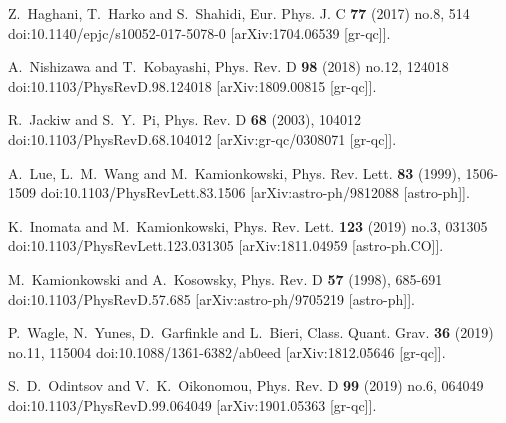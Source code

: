 \documentclass{article}
\begin{document}
\begin{thebibliography}{99}
Z.~Haghani, T.~Harko and S.~Shahidi,
Eur. Phys. J. C \textbf{77} (2017) no.8, 514
doi:10.1140/epjc/s10052-017-5078-0
[arXiv:1704.06539 [gr-qc]].


A.~Nishizawa and T.~Kobayashi,
Phys. Rev. D \textbf{98} (2018) no.12, 124018
doi:10.1103/PhysRevD.98.124018
[arXiv:1809.00815 [gr-qc]].


R.~Jackiw and S.~Y.~Pi,
Phys. Rev. D \textbf{68} (2003), 104012
doi:10.1103/PhysRevD.68.104012
[arXiv:gr-qc/0308071 [gr-qc]].


A.~Lue, L.~M.~Wang and M.~Kamionkowski,
Phys. Rev. Lett. \textbf{83} (1999), 1506-1509
doi:10.1103/PhysRevLett.83.1506
[arXiv:astro-ph/9812088 [astro-ph]].

K.~Inomata and M.~Kamionkowski,
Phys. Rev. Lett. \textbf{123} (2019) no.3, 031305
doi:10.1103/PhysRevLett.123.031305
[arXiv:1811.04959 [astro-ph.CO]].


M.~Kamionkowski and A.~Kosowsky,
Phys. Rev. D \textbf{57} (1998), 685-691
doi:10.1103/PhysRevD.57.685
[arXiv:astro-ph/9705219 [astro-ph]].


P.~Wagle, N.~Yunes, D.~Garfinkle and L.~Bieri,
Class. Quant. Grav. \textbf{36} (2019) no.11, 115004
doi:10.1088/1361-6382/ab0eed
[arXiv:1812.05646 [gr-qc]].


S.~D.~Odintsov and V.~K.~Oikonomou,
Phys. Rev. D \textbf{99} (2019) no.6, 064049
doi:10.1103/PhysRevD.99.064049
[arXiv:1901.05363 [gr-qc]].


\end{thebibliography}
\end{document}
